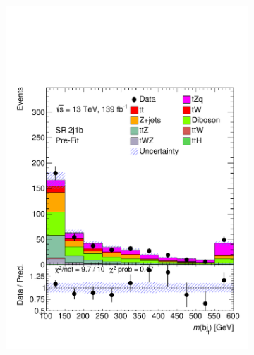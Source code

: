  
 
\begin{figure}[!h] 
  \begin{subfigure}[b]{0.33\linewidth}
    \centering
    \includegraphics[width=\textwidth]{ubonn-thesis/Chapters/Chapters_08/appendix/data/SR_2j1b.pdf} 
  \end{subfigure}%
  \begin{subfigure}[b]{0.33\linewidth}
    \centering

\end{subfigure}
\end{figure}
